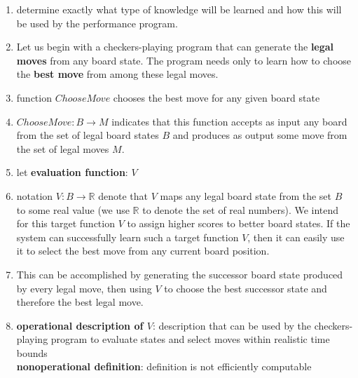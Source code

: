 \begin{enumerate}[itemsep=0.2cm]
    \item determine exactly what type of knowledge will be learned and how this will be used by the performance program.
    \hfill \cite{ml/book/Machine-Learning/Tom-M-Mitchell}

    \item Let us begin with a checkers-playing program that can generate the \textbf{legal moves} from any board state. The program needs only to learn how to choose the \textbf{best move} from among these legal moves.
    \hfill \cite{ml/book/Machine-Learning/Tom-M-Mitchell}

    \item function $ChooseMove$ chooses the best move for any given board state
    \hfill \cite{ml/book/Machine-Learning/Tom-M-Mitchell}

    \item $ChooseMove : B \to M$ indicates that this function accepts as input any board from the set of legal board states $B$ and produces as output some move from the set of legal moves $M$.
    \hfill \cite{ml/book/Machine-Learning/Tom-M-Mitchell}

    \item let \textbf{evaluation function}: $V$
    \hfill \cite{ml/book/Machine-Learning/Tom-M-Mitchell}

    \item notation $V : B \to \mathbb{R}$ denote that $V$ maps any legal board state from the set $B$ to some real value (we use $\mathbb{R}$ to denote the set of real numbers). We intend for this target function $V$ to assign higher scores to better board states. If the system can successfully learn such a target function $V$, then it can easily use it to select the best move from any current board position.
    \hfill \cite{ml/book/Machine-Learning/Tom-M-Mitchell}

    \item This can be accomplished by generating the successor board state produced by every legal move, then using $V$ to choose the best successor state and therefore the best legal move. 
    \hfill \cite{ml/book/Machine-Learning/Tom-M-Mitchell}

    \item \textbf{operational description of $V$}: description that can be used by the checkers-playing program to evaluate states and select moves within realistic time bounds
    \hfill \cite{ml/book/Machine-Learning/Tom-M-Mitchell}
    \\
    \textbf{nonoperational definition}: definition is not efficiently computable
    \hfill \cite{ml/book/Machine-Learning/Tom-M-Mitchell}


\end{enumerate}
